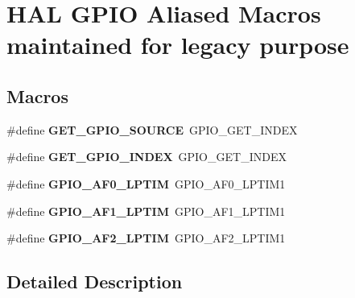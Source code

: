 \hypertarget{group___h_a_l___g_p_i_o___aliased___macros}{}\section{H\+AL G\+P\+IO Aliased Macros maintained for legacy purpose}
\label{group___h_a_l___g_p_i_o___aliased___macros}
\subsection*{Macros}
\begin{DoxyCompactItemize}
\item 
\#define {\bfseries G\+E\+T\+\_\+\+G\+P\+I\+O\+\_\+\+S\+O\+U\+R\+CE}~G\+P\+I\+O\+\_\+\+G\+E\+T\+\_\+\+I\+N\+D\+EX\hypertarget{group___h_a_l___g_p_i_o___aliased___macros_ga519fafd507db0341f56b24e6f5509561}{}\label{group___h_a_l___g_p_i_o___aliased___macros_ga519fafd507db0341f56b24e6f5509561}

\item 
\#define {\bfseries G\+E\+T\+\_\+\+G\+P\+I\+O\+\_\+\+I\+N\+D\+EX}~G\+P\+I\+O\+\_\+\+G\+E\+T\+\_\+\+I\+N\+D\+EX\hypertarget{group___h_a_l___g_p_i_o___aliased___macros_ga1c140fcfc79bb7185eed044b05792d70}{}\label{group___h_a_l___g_p_i_o___aliased___macros_ga1c140fcfc79bb7185eed044b05792d70}

\item 
\#define {\bfseries G\+P\+I\+O\+\_\+\+A\+F0\+\_\+\+L\+P\+T\+IM}~G\+P\+I\+O\+\_\+\+A\+F0\+\_\+\+L\+P\+T\+I\+M1\hypertarget{group___h_a_l___g_p_i_o___aliased___macros_gab7abf9473a43a0b3d2c494d9946ef5ab}{}\label{group___h_a_l___g_p_i_o___aliased___macros_gab7abf9473a43a0b3d2c494d9946ef5ab}

\item 
\#define {\bfseries G\+P\+I\+O\+\_\+\+A\+F1\+\_\+\+L\+P\+T\+IM}~G\+P\+I\+O\+\_\+\+A\+F1\+\_\+\+L\+P\+T\+I\+M1\hypertarget{group___h_a_l___g_p_i_o___aliased___macros_ga4dd6c2f7aa06ea43dd9e6fe568c34e60}{}\label{group___h_a_l___g_p_i_o___aliased___macros_ga4dd6c2f7aa06ea43dd9e6fe568c34e60}

\item 
\#define {\bfseries G\+P\+I\+O\+\_\+\+A\+F2\+\_\+\+L\+P\+T\+IM}~G\+P\+I\+O\+\_\+\+A\+F2\+\_\+\+L\+P\+T\+I\+M1\hypertarget{group___h_a_l___g_p_i_o___aliased___macros_ga93742854899db59892aa438ce7c8a2d6}{}\label{group___h_a_l___g_p_i_o___aliased___macros_ga93742854899db59892aa438ce7c8a2d6}

\end{DoxyCompactItemize}


\subsection{Detailed Description}
